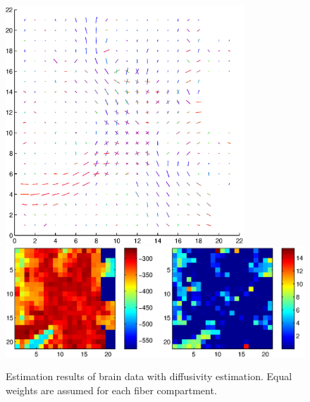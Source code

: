 \documentclass{article}
\begin{document}
\begin{figure}[H]
  \caption{Estimation results of brain data with diffusivity estimation. Equal weights are assumed for each fiber compartment.}
  \centering
  \includegraphics[width=0.8\textwidth]{figures/brain_bas_diffus_dir.eps}
  \includegraphics[width=\textwidth]{figures/brain_bas_diffus_like.eps}
\end{figure}
\end{document}
